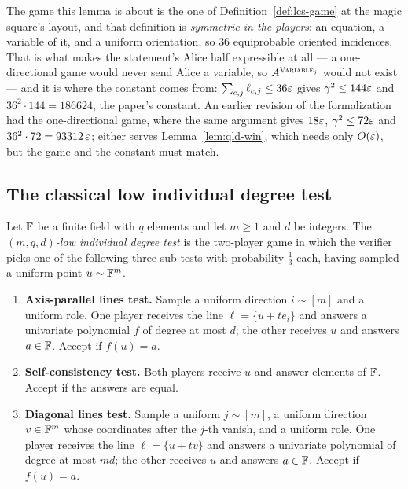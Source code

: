 The game this lemma is about is the one of Definition~\ref{def:lcs-game} at the magic square's
layout, and that definition is \emph{symmetric in the players}: an equation, a variable of it,
and a uniform orientation, so $36$ equiprobable oriented incidences. That is what makes the
statement's Alice half expressible at all --- a one-directional game would never send Alice a
variable, so $A^{\textsc{Variable}_j}$ would not exist --- and it is where the constant comes from:
$\sum_{c,j} \ell_{c,j} \leq 36\varepsilon$ gives $\gamma^2 \leq 144\varepsilon$ and
$36^2 \cdot 144 = 186624$, the paper's constant. An earlier revision of the formalization had
the one-directional game, where the same argument gives $18\varepsilon$, $\gamma^2 \leq 72\varepsilon$ and
$36^2 \cdot 72 = 93312\,\varepsilon$; either serves Lemma~\ref{lem:qld-win}, which needs only
$O(\varepsilon)$, but the game and the constant must match.

\subsection{The classical low individual degree test}
\label{sec:rr-lidt}

\effortHard

\begin{definition}
\label{def:lidt}
\leanok
Let $\mathbb{F}$ be a finite field with $q$ elements and let $m \geq 1$ and $d$ be integers.
The \emph{$(m,q,d)$-low individual degree test} is the two-player game in which the
verifier picks one of the following three sub-tests with probability $\tfrac13$ each,
having sampled a uniform point $u \sim \mathbb{F}^m$.
\begin{enumerate}
\item \textbf{Axis-parallel lines test.} Sample a uniform direction $i \sim [m]$ and a
  uniform role. One player receives the line $\ell = \{u + t e_i\}$ and answers a
  univariate polynomial $f$ of degree at most $d$; the other receives $u$ and
  answers $a \in \mathbb{F}$. Accept if $f(u) = a$.
\item \textbf{Self-consistency test.} Both players receive $u$ and answer elements of
  $\mathbb{F}$. Accept if the answers are equal.
\item \textbf{Diagonal lines test.} Sample a uniform $j \sim [m]$, a uniform direction
  $v \in \mathbb{F}^m$ whose coordinates after the $j$-th vanish, and a uniform role. One
  player receives the line $\ell = \{u + t v\}$ and answers a univariate polynomial
  of degree at most $md$; the other receives $u$ and answers $a \in \mathbb{F}$. Accept if
  $f(u) = a$.
\end{enumerate}
\end{definition}

